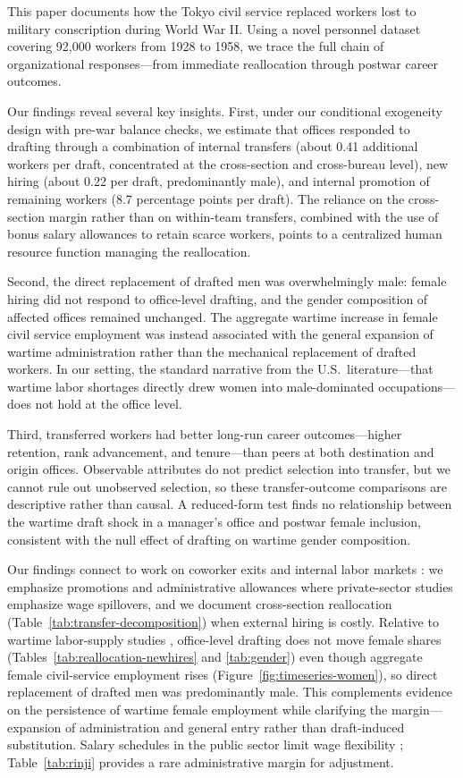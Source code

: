 This paper documents how the Tokyo civil service replaced workers lost to military conscription during World War II. Using a novel personnel dataset covering 92,000 workers from 1928 to 1958, we trace the full chain of organizational responses---from immediate reallocation through postwar career outcomes.

Our findings reveal several key insights. First, under our conditional exogeneity design with pre-war balance checks, we estimate that offices responded to drafting through a combination of internal transfers (about 0.41 additional workers per draft, concentrated at the cross-section and cross-bureau level), new hiring (about 0.22 per draft, predominantly male), and internal promotion of remaining workers (8.7 percentage points per draft). The reliance on the cross-section margin rather than on within-team transfers, combined with the use of bonus salary allowances to retain scarce workers, points to a centralized human resource function managing the reallocation.

Second, the direct replacement of drafted men was overwhelmingly male: female hiring did not respond to office-level drafting, and the gender composition of affected offices remained unchanged. The aggregate wartime increase in female civil service employment was instead associated with the general expansion of wartime administration rather than the mechanical replacement of drafted workers. In our setting, the standard narrative from the U.S.\ literature---that wartime labor shortages directly drew women into male-dominated occupations---does not hold at the office level.

Third, transferred workers had better long-run career outcomes---higher retention, rank advancement, and tenure---than peers at both destination and origin offices. Observable attributes do not predict selection into transfer, but we cannot rule out unobserved selection, so these transfer-outcome comparisons are descriptive rather than causal. A reduced-form test finds no relationship between the wartime draft shock in a manager's office and postwar female inclusion, consistent with the null effect of drafting on wartime gender composition.

Our findings connect to work on coworker exits and internal labor markets \citep{JaegerDeath}: we emphasize promotions and administrative allowances where private-sector studies emphasize wage spillovers, and we document cross-section reallocation (Table~\ref{tab:transfer-decomposition}) when external hiring is costly. Relative to wartime labor-supply studies \citep{Acemoglu,101221}, office-level drafting does not move female shares (Tables~\ref{tab:reallocation-newhires} and \ref{tab:gender}) even though aggregate female civil-service employment rises (Figure~\ref{fig:timeseries-women}), so direct replacement of drafted men was predominantly male. This complements evidence on the persistence of wartime female employment \citep{Rose_2018} while clarifying the margin---expansion of administration and general entry rather than draft-induced substitution. Salary schedules in the public sector limit wage flexibility \citep{GoldinMargoQJE}; Table~\ref{tab:rinji} provides a rare administrative margin for adjustment.

